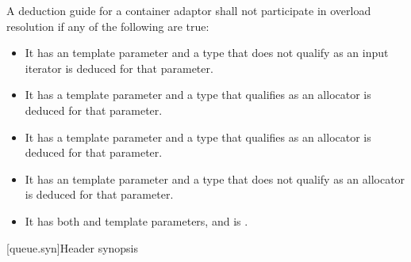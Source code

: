 \pnum
A deduction guide for a container adaptor shall not participate in overload resolution if any of the following are true:
\begin{itemize}
\item It has an  template parameter and a type that does not qualify as an input iterator is deduced for that parameter.
\item It has a  template parameter and a type that qualifies as an allocator is deduced for that parameter.
\item It has a  template parameter and a type that qualifies as an allocator is deduced for that parameter.
\item It has an  template parameter and a type that does not qualify as an allocator is deduced for that parameter.
\item It has both  and  template parameters, and  is .
\end{itemize}

[queue.syn]{Header  synopsis}

